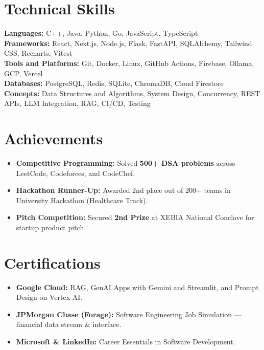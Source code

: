 \documentclass[letterpaper,11pt]{article}
\begin{document}
\section{Technical Skills}
 \begin{itemize}[leftmargin=0.15in, label={}]
    \small{\item{
     \textbf{Languages:}{ C++, Java, Python, Go, JavaScript, TypeScript} \\
     \textbf{Frameworks:}{ React, Next.js, Node.js, Flask, FastAPI, SQLAlchemy, Tailwind CSS, Recharts, Vitest} \\
     \textbf{Tools and Platforms:}{ Git, Docker, Linux, GitHub Actions, Firebase, Ollama, GCP, Vercel} \\
     \textbf{Databases:}{ PostgreSQL, Redis, SQLite, ChromaDB, Cloud Firestore} \\
     \textbf{Concepts:}{ Data Structures and Algorithms, System Design, Concurrency, REST APIs, LLM Integration, RAG, CI/CD, Testing}
    }}
 \end{itemize}

\section{Achievements}
 \begin{itemize}[leftmargin=0.2in, itemsep=1pt, topsep=2pt]
    \small
    \item \textbf{Competitive Programming:} Solved \textbf{500+ DSA problems} across LeetCode, Codeforces, and CodeChef.
    \item \textbf{Hackathon Runner-Up:} Awarded 2nd place out of 200+ teams in University Hackathon (Healthcare Track).
    \item \textbf{Pitch Competition:} Secured \textbf{2nd Prize} at XEBIA National Conclave for startup product pitch.
 \end{itemize}

\section{Certifications}
 \begin{itemize}[leftmargin=0.2in, itemsep=1pt, topsep=2pt]
    \small
    \item \textbf{Google Cloud:} RAG, GenAI Apps with Gemini and Streamlit, and Prompt Design on Vertex AI.
    \item \textbf{JPMorgan Chase (Forage):} Software Engineering Job Simulation --- financial data stream \& interface.
    \item \textbf{Microsoft \& LinkedIn:} Career Essentials in Software Development.
 \end{itemize}
\end{document}
